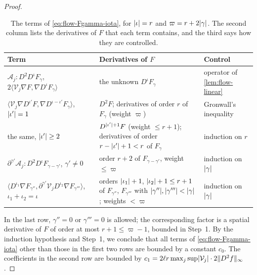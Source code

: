 \begin{proof}
\begin{table}[ht]
\centering
\small
\caption{The terms of \eqref{eq:flow-Fgamma-iota}, for $\lvert \iota\rvert=r$ and
$\varpi=r+2\lvert \gamma\rvert$. The second column lists the derivatives of $F$ that each term
contains, and the third says how they are controlled.}\label{tab:flow-weights}
\begin{tabular}{@{}>{\raggedright\arraybackslash}p{}>{\raggedright\arraybackslash}p{}>{\raggedright\arraybackslash}p{}@{}}
\toprule
Term & Derivatives of $F$ & Control\\
\midrule
$\mathcal A_j\mathbin{:}D^2D^\iota F_\gamma$,
$2\langle\mathcal V_j\nabla F,\nabla D^\iota F_\gamma\rangle$
 & the unknown $D^\iota F_\gamma$ & operator of \cref{lem:flow-linear}\\
$\langle\mathcal V_j\nabla D^{\iota'}F,\nabla D^{\iota-\iota'}F_\gamma\rangle$,
$\lvert \iota'\rvert=1$
 & $D^2F$; derivatives of order $r$ of $F_\gamma$ (weight $\varpi$)
 & Gronwall's inequality\\
the same, $\lvert \iota'\rvert\ge2$
 & $D^{\lvert \iota'\rvert+1}F$ (weight $\le r+1$); derivatives of order
 $r-\lvert \iota'\rvert+1<r$ of $F_\gamma$ & induction on $r$\\
$\partial^{\gamma'}\mathcal A_j\mathbin{:}D^2D^\iota F_{\gamma-\gamma'}$,
$\gamma'\ne0$
 & order $r+2$ of $F_{\gamma-\gamma'}$, weight $\le\varpi$ & induction on $\lvert \gamma\rvert$\\
$\langle D^{\iota_1}\nabla F_{\gamma''},\partial^{\gamma'}\mathcal V_j
D^{\iota_2}\nabla F_{\gamma'''}\rangle$, $\iota_1+\iota_2=\iota$
 & orders $\lvert \iota_1\rvert+1$, $\lvert \iota_2\rvert+1\le r+1$ of $F_{\gamma''}$,
 $F_{\gamma'''}$ with $\lvert \gamma''\rvert,\lvert \gamma'''\rvert<\lvert \gamma\rvert$; weights $<\varpi$
 & induction on $\lvert \gamma\rvert$\\
\bottomrule
\end{tabular}
\end{table}

In the last row, $\gamma''=0$ or $\gamma'''=0$ is allowed; the corresponding
factor is a spatial derivative of $F$ of order at most $r+1\le\varpi-1$, bounded in
Step~1. By the induction hypothesis and Step~1, we conclude that all terms of
\eqref{eq:flow-Fgamma-iota} other than those in the first two rows are bounded by
a constant $c_0$. The coefficients in the second row are bounded by
$c_1=2\ell r\max_j\sup\lvert \mathcal V_j\rvert\cdot2\lVert D^2f\rVert_\infty$.


\end{proof}
